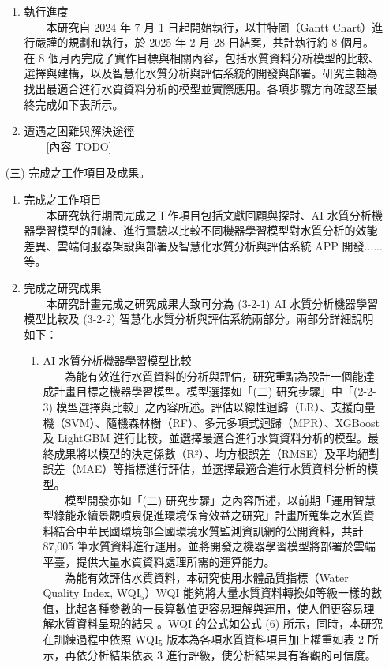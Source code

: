 \documentclass[12pt,a4paper]{article}
\begin{document}
\begin{enumerate}
\begin{enumerate}[label=\arabic*.]
\item 執行進度\\
　　本研究自 2024 年 7 月 1 日起開始執行，以甘特圖（Gantt Chart）進行嚴謹的規劃和執行，於 2025 年 2 月 28 日結案，共計執行約 8 個月。在 8 個月內完成了實作目標與相關內容，包括水質資料分析模型的比較、選擇與建構，以及智慧化水質分析與評估系統的開發與部署。研究主軸為找出最適合進行水質資料分析的模型並實際應用。各項步驟方向確認至最終完成如下表所示。
\item 遭遇之困難與解決途徑\\
　　[內容 TODO]
\end{enumerate}

\item[(三)] 完成之工作項目及成果。
\begin{enumerate}[label=\arabic*.]
\item 完成之工作項目\\
　　本研究執行期間完成之工作項目包括文獻回顧與探討、AI 水質分析機器學習模型的訓練、進行實驗以比較不同機器學習模型對水質分析的效能差異、雲端伺服器架設與部署及智慧化水質分析與評估系統 APP 開發......等。
\item 完成之研究成果\\
　　本研究計畫完成之研究成果大致可分為 (3-2-1) AI 水質分析機器學習模型比較及 (3-2-2) 智慧化水質分析與評估系統兩部分。兩部分詳細說明如下：
    \begin{enumerate}[label=3-2-\arabic*.]
        \item AI 水質分析機器學習模型比較\\
        　　為能有效進行水質資料的分析與評估，研究重點為設計一個能達成計畫目標之機器學習模型。模型選擇如「(二) 研究步驟」中「(2-2-3) 模型選擇與比較」之內容所述。評估以線性迴歸（LR）、支援向量機（SVM）、隨機森林樹（RF）、多元多項式迴歸（MPR）、XGBoost 及 LightGBM 進行比較，並選擇最適合進行水質資料分析的模型。最終成果將以模型的決定係數（R²）、均方根誤差（RMSE）及平均絕對誤差（MAE）等指標進行評估，並選擇最適合進行水質資料分析的模型。\\
        　　模型開發亦如「(二) 研究步驟」之內容所述，以前期「運用智慧型綠能永續景觀噴泉促進環境保育效益之研究」計畫所蒐集之水質資料結合中華民國環境部全國環境水質監測資訊網的公開資料，共計 87,005 筆水質資料進行運用。並將開發之機器學習模型將部署於雲端平臺，提供大量水質資料處理所需的運算能力。\\
        　　為能有效評估水質資料，本研究使用水體品質指標（Water Quality Index, WQI$_5$）WQI 能夠將大量水質資料轉換如等級一樣的數值，比起各種參數的一長算數值更容易理解與運用，使人們更容易理解水質資料呈現的結果 \cite{ref35}。WQI 的公式如公式 (6) 所示，同時，本研究在訓練過程中依照 WQI$_5$ 版本為各項水質資料項目加上權重如表 2 所示，再依分析結果依表 3 進行評級，使分析結果具有客觀的可信度。\\

\end{enumerate}
\end{enumerate}
\end{enumerate}
\end{document}
